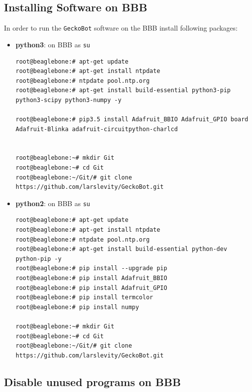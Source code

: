 \documentclass[
	fontsize=10pt
	paper=a4
]{scrartcl}
\begin{document}
\subsection{Installing Software on BBB}
In order to run the \texttt{GeckoBot} software on the BBB install following packages:
\begin{itemize}


\item \textbf{python3}: on BBB as \texttt{su}
\begin{lstlisting}
root@beaglebone:# apt-get update
root@beaglebone:# apt-get install ntpdate
root@beaglebone:# ntpdate pool.ntp.org
root@beaglebone:# apt-get install build-essential python3-pip python3-scipy python3-numpy -y

root@beaglebone:# pip3.5 install Adafruit_BBIO Adafruit_GPIO board Adafruit-Blinka adafruit-circuitpython-charlcd


root@beaglebone:~# mkdir Git
root@beaglebone:~# cd Git
root@beaglebone:~/Git/# git clone https://github.com/larslevity/GeckoBot.git

\end{lstlisting}



\item \begin{footnotesize}
\textbf{python2}:
on BBB as \texttt{su}
\begin{lstlisting}
root@beaglebone:# apt-get update
root@beaglebone:# apt-get install ntpdate
root@beaglebone:# ntpdate pool.ntp.org
root@beaglebone:# apt-get install build-essential python-dev python-pip -y
root@beaglebone:# pip install --upgrade pip
root@beaglebone:# pip install Adafruit_BBIO
root@beaglebone:# pip install Adafruit_GPIO
root@beaglebone:# pip install termcolor
root@beaglebone:# pip install numpy

root@beaglebone:~# mkdir Git
root@beaglebone:~# cd Git
root@beaglebone:~/Git/# git clone https://github.com/larslevity/GeckoBot.git

\end{lstlisting}
\end{footnotesize}


\end{itemize}



\subsection{Disable unused programs on BBB}
\end{document}
